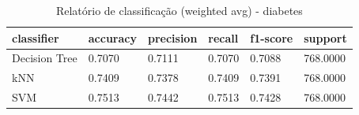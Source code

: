 \begin{table}[htbp]
\centering
\begin{tabular}{llllll}
\hline
classifier & accuracy & precision & recall & f1-score & support \\
\hline
Decision Tree & 0.7070 & 0.7111 & 0.7070 & 0.7088 & 768.0000 \\
kNN & 0.7409 & 0.7378 & 0.7409 & 0.7391 & 768.0000 \\
SVM & 0.7513 & 0.7442 & 0.7513 & 0.7428 & 768.0000 \\
\hline
\end{tabular}
\caption{Relatório de classificação (weighted avg) - diabetes}
\label{tab:ex3-diabetes-classification-report}
\end{table}